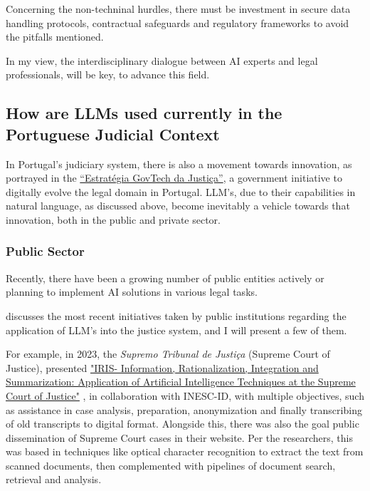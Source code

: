 \documentclass[11pt,a4paper,twoside,openright]{book}
\begin{document}
\par Concerning the non-techninal hurdles, there must be investment in secure data handling protocols, contractual safeguards and regulatory frameworks to avoid the pitfalls mentioned. \parencite{surden_chatgpt_AI_llms_law_2023,siino_exploring_llms_law_2025,shao_llms_meet_law_2025} 


\par In my view, the interdisciplinary dialogue between AI experts and legal professionals, will be key, to advance this field.












\subsection{How are LLMs used currently in the Portuguese Judicial Context}
In Portugal's judiciary system, there is also a movement towards innovation, as portrayed in the  \href{https://govtech.justica.gov.pt/}{“Estratégia GovTech da Justiça”}, a government initiative to digitally evolve the legal domain in Portugal.
LLM's, due to their capabilities in natural language, as discussed above, become inevitably a vehicle towards that innovation, both in the public and private sector.

\subsubsection{Public Sector}

Recently, there have been a growing number of public entities actively or planning to implement AI solutions in various legal tasks.

\par \textcite{IA_Portugal_2024} discusses the most recent initiatives taken by public institutions regarding the application of LLM's into the justice system, and I will present a few of them. 
\par For example, in 2023, the \textit{Supremo Tribunal de Justiça }(Supreme Court of Justice), presented \href{https://stjiris.github.io/}{"IRIS- Information, Rationalization, Integration and Summarization: Application of Artificial Intelligence Techniques at the Supreme Court of Justice"} , in collaboration with INESC-ID, with multiple objectives, such as assistance in case analysis, preparation, anonymization and finally transcribing of old transcripts to digital format. Alongside this, there was also the goal public dissemination of Supreme Court cases in their website. Per the researchers, this was based in techniques like optical character recognition to extract the text from scanned documents, then complemented with pipelines of document search, retrieval and analysis.
\end{document}
